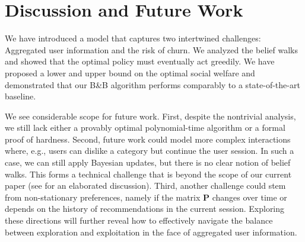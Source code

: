 \section{Discussion and Future Work}\label{sec:disc}
We have introduced a model that captures two intertwined challenges: Aggregated user information and the risk of churn. We analyzed the belief walks and showed that the optimal policy must eventually act greedily. We have proposed a lower and upper bound on the optimal social welfare and demonstrated that our B\&B algorithm performs comparably to a state-of-the-art baseline.

We see considerable scope for future work. First, despite the nontrivial analysis, we still lack either a provably optimal polynomial-time algorithm or a formal proof of hardness. Second, future work could model more complex interactions where, e.g., users can dislike a category but continue the user session. In such a case, we can still apply Bayesian updates, but there is no clear notion of belief walks. This forms a technical challenge that is beyond the scope of our current paper (see  for an elaborated discussion). %
Third, another challenge could stem from non-stationary preferences, namely if the matrix $\bm P$ changes over time or depends on the history of recommendations in the current session. 
Exploring these directions will further reveal how to effectively navigate the balance between exploration and exploitation in the face of aggregated user information. 




